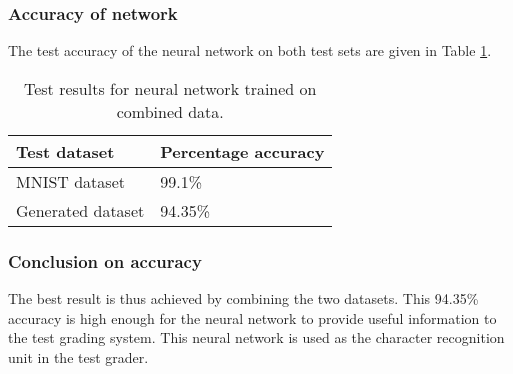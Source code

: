 \subsubsection{Accuracy of network}
The test accuracy of the neural network on both test sets are given in Table \ref{tbl:nnResult3}.

\begin{table}
\caption{Test results for neural network trained on combined data.} \label{tbl:nnResult3}
  \centering
\begin{tabular}{|p{4cm}|p{5cm}|}
\hline
\textbf{Test dataset}&\textbf{Percentage accuracy}\\
\hline
MNIST dataset&99.1\%\\
\hline
Generated dataset&94.35\%\\
\hline
\end{tabular}
\end{table}

\subsubsection{Conclusion on accuracy}
The best result is thus achieved by combining the two datasets. This 94.35\% accuracy is high enough for the neural network to provide useful information to the test grading system. This neural network is used as the character recognition unit in the test grader.